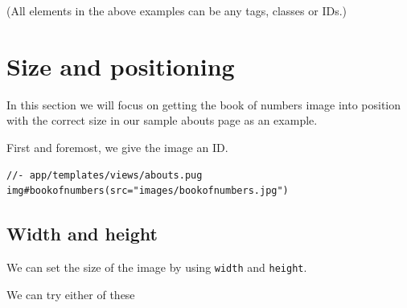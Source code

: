 (All elements in the above examples can be any tags, classes or IDs.)

\section{Size and positioning}

In this section we will focus on getting the book of numbers image into position with the correct size in our sample abouts page as an example. 

First and foremost, we give the image an ID. 

\begin{lstlisting}
//- app/templates/views/abouts.pug
img#bookofnumbers(src="images/bookofnumbers.jpg")
\end{lstlisting}

\subsection{Width and height}
\label{sec:width}

We can set the size of the image by using \texttt{width} and \texttt{height}.

We can try either of these

